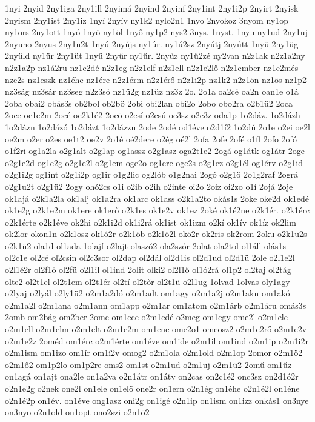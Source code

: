 {1nyi
2nyid
2ny1iga
2ny1ill
2nyimá
2nyind
2nyinf
2ny1int
2ny1i2p
2nyirt
2nyisk
2nyism
2ny1ist
2ny1iz
1nyí
2nyív
ny1k2
nylo2n1
1nyo
2nyokoz
3nyom
ny1op
ny1ors
2ny1ott
1nyó
1nyö
ny1öl
1nyő
ny1p2
nys2
3nys.
1nyst.
1nyu
ny1ud
2ny1uj
2nyuno
2nyus
2ny1u2t
1nyú
2nyújs
ny1úr.
ny1ú2sz
2nyútj
2nyútt
1nyü
2ny1üg
2nyüld
ny1ür
2ny1üt
1nyű
2nyűr
ny1űr.
2nyűz
ny1ű2zé
ny2van
n2z1ak
n2z1a2ny
n2z1a2p
nz1á2ru
nz1e2dé
n2z1eg
n2z1elf
n2z1ell
n2z1e2lő
n2z1ember
nz1e2més
nze2s
nz1eszk
nz1éhe
nz1ére
n2z1érm
n2z1érő
n2z1i2p
nz1k2
n2z1ön
nz1ös
nz1p2
nz3ság
nz3sár
nz3seg
n2z3só
nz1ü2g
nz1üz
nz3z
2o.
2o1a
oa2cé
oa2n
oan1e
o1á
2oba
obai2
obás3s
ob2bol
ob2bö
2obi
obi2lan
obi2o
2obo
obo2ra
o2b1ü2
2oca
2oce
oc1e2m
2océ
oc2k1é2
2ocö
o2csí
o2csú
oc3sz
o2c3z
oda1p
1o2dáz.
1o2dázh
1o2dázn
1o2dázó
1o2dázt
1o2dázzu
2ode
2odé
od1éve
o2d1í2
1o2dú
2o1e
o2ei
oe2l
oe2m
o2er
o2es
oe1t2
oe2v
2o1é
oé2dere
o2ég
oé2l
2ofa
2ofe
2ofé
o1fl
2ofo
2ofó
o1f2ri
og1a2la
o2g1alt
o2g1ap
og1assz
o2g1asz
oga2t1e2
2ogá
og1átk
og1átr
2oge
o2g1e2d
og1e2g
o2g1e2l
o2g1em
oge2o
og1ere
oge2s
o2g1ez
o2g1él
og1érv
o2g1id
o2g1i2g
og1int
o2g1i2p
og1ir
o1g2lic
og2lób
o1g2nai
2ogó
o2g1ö
2o1g2raf
2ográ
o2g1u2t
o2g1ü2
2ogy
ohó2cs
o1i
o2ib
o2ih
o2inte
oi2o
2oiz
oi2zo
o1í
2ojá
2oje
ok1ajá
o2k1a2la
ok1alj
ok1a2ra
ok1arc
ok1ass
o2k1a2to
okás1s
2oke
oke2d
ok1edé
ok1e2g
o2k1e2m
ok1ere
ok1erő
o2k1es
ok1e2v
ok1ez
2oké
ok1é2ne
o2k1ér.
o2k1érc
o2k1érte
o2k1éve
ok2hi
o2k1i2d
ok1i2rá
ok1ist
ok1izm
o2kí
ok1ív
ok1íz
ok2lim
ok2lor
okon1n
o2k1osz
ok1ó2r
o2k1öb
o2k1ö2l
okö2r
ok2ris
ok2rom
2oku
o2k1u2s
o2k1ü2
ola1d
ol1ada
1olajf
o2lajt
olaszó2
ola2szór
2olat
ola2tol
ol1áll
olás1s
ol2c1e
ol2cé
ol2csin
ol2c3sor
ol2dap
ol2dál
ol2d1is
ol2d1ud
ol2d1ü
2ole
o2l1e2l
o2l1é2r
ol2f1ö
ol2fü
o2l1il
ol1ind
2olit
olki2
ol2l1ő
ol1ó2rá
ol1p2
ol2taj
ol2tág
olte2
ol2t1el
ol2t1em
ol2t1ér
ol2tí
ol2tőr
ol2t1ü
o2l1ug
1olvad
1olvas
oly1agy
o2lyaj
o2lyál
o2ly1ü2
o2m1a2dó
o2m1adt
om1agy
o2m1a2j
o2m1akn
om1akó
o2m1a2l
o2m1ana
o2m1ann
om1app
o2m1ar
om1atom
o2m1árb
o2m1áru
omás3s
2omb
om2bág
om2ber
2ome
om1ece
o2m1edé
o2meg
om1egy
ome2l
o2m1ele
o2m1ell
o2m1elm
o2m1elt
o2m1e2m
om1ene
ome2o1
omeosz2
o2m1e2rő
o2m1e2v
o2m1e2z
2oméd
om1érc
o2m1érte
om1éve
om1ide
o2m1il
om1ind
o2m1ip
o2m1i2r
o2m1ism
om1izo
om1ír
om1í2v
omog2
o2m1ola
o2m1old
o2m1op
2omor
o2m1ö2
o2m1ő2
om1p2lo
om1p2re
oms2
om1st
o2m1ud
o2m1uj
o2m1ü2
2omű
om1űz
on1agá
on1ajt
ona2le
on1a2va
o2n1átr
on1átv
on2cas
on2c1é2
onc3sz
on2d1ó2r
o2n1e2g
o2nek
one2l
on1ele
on1elő
one2r
on1ern
o2n1ég
on1éhe
o2n1é2l
on1éne
o2n1é2p
on1év.
on1éve
ong1asz
oni2g
on1igé
o2n1ip
on1ism
on1izz
onkás1
on3nye
on3nyo
o2n1old
on1opt
ono2szi
o2n1ö2
}
